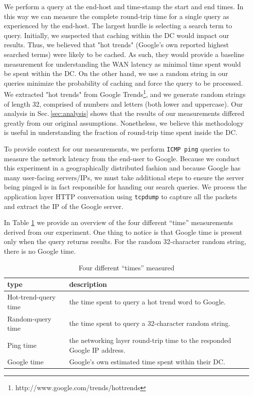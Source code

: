 We perform a query at the end-host and time-stamp the start and end times. In this way we can measure the complete round-trip time for a single query as experienced by the end-host. The largest hurdle is selecting a search term to query. Initially, we suspected that caching within the DC would impact our results. Thus, we believed that "hot trends" (Google's own reported highest searched terms) were likely to be cached. As such, they would provide a baseline measurement for understanding the WAN latency as minimal time spent would be spent within the DC. On the other hand, we use a random string in our  queries minimize the probability of caching and force the query to be processed. We extracted "hot trends" from Google Trends\footnote{http://www.google.com/trends/hottrends}, and we generate random strings of length 32, comprised of numbers and letters (both lower and uppercase). Our analysis in Sec.\,\ref{sec:analysis} shows that the results of our measurements differed greatly from our original assumptions. Nonetheless, we believe this methodology is useful in understanding the fraction of round-trip time spent inside the DC.

To provide context for our measurements, we perform \texttt{ICMP ping} queries to measure the network latency from the end-user to Google. Because we conduct this experiment in a geographically distributed fashion and because Google has many user-facing servers/IPs, we must take additional steps to ensure the server being pinged is in fact responsible for handing our search queries. We process the application layer HTTP conversation using \texttt{tcpdump} to capture all the packets and extract the IP of the Google server.
 
In Table \ref{tab:DC_method} we provide an overview of the four different ``time'' measurements derived from our experiment. One thing to notice is that Google time is present only when the query returns results. For the random 32-character random string, there is no Google time.

\begin{table}
  \begin{tabular}{p{2.3cm} | p{5.5cm}}
    \hline
    type & description \\
    \hline
    Hot-trend-query time & the time spent to query a hot trend word to Google. \\
    \hline
    Random-query time & the time spent to query a 32-character random string.  \\
    \hline
    Ping time & the networking layer round-trip time to the responded Google IP address. \\
    \hline
    Google time & Google's own estimated time spent within their DC. \\
    \hline
  \end{tabular}
  \vspace{1em}
  \caption{Four different ``times'' measured}
  \label{tab:DC_method}
\end{table}


